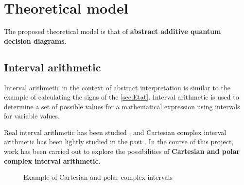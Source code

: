 \newpage

\chapter{Theoretical model}
\label{ch:Modele}

The proposed theoretical model is that of \textbf{abstract additive quantum decision diagrams}.

\section{Interval arithmetic}
\label{sec:ArithmetiqueIntervalles}

Interval arithmetic in the context of abstract interpretation is similar to the example of calculating the signs of the \autoref{sec:Etat}. Interval arithmetic is used to determine a set of possible values for a mathematical expression using intervals for variable values.

Real interval arithmetic has been studied \cite{Sunaga_2009}, and Cartesian complex interval arithmetic has been lightly studied in the past \cite{Rokne_1971}. In the course of this project, work has been carried out to explore the possibilities of \textbf{Cartesian and polar complex interval arithmetic}.

\begin{figure}
  \centering
  \caption{Example of Cartesian and polar complex intervals}
  \label{fig:intervalles}
\end{figure}

